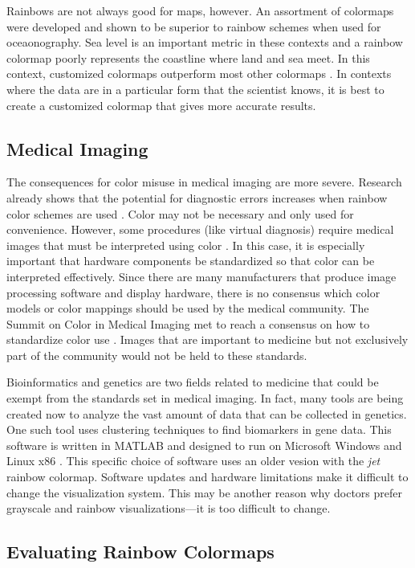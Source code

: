 \documentclass[journal,12pt]{IEEEtran}
\begin{document}
Rainbows are not always good for maps, however. An assortment of colormaps were
developed and shown to be superior to rainbow schemes when used for oceaonography.
Sea level is an important metric in these contexts and a rainbow colormap poorly 
represents the coastline where land and sea meet. In this context, customized colormaps
outperform most other colormaps \cite{oceanography}. In contexts where the data are in a particular form
that the scientist knows, it is best to create a customized colormap that gives 
more accurate results.

\subsection{Medical Imaging}

The consequences for color misuse in medical imaging are more severe. Research
already shows that the potential for diagnostic errors increases when 
rainbow color schemes are used \cite{arteryvis}. Color may not
be necessary and only used for convenience. However, some procedures (like virtual diagnosis) require 
medical images that must be interpreted using color \cite{standardmedimg}. In this case, it
is especially important that hardware components be standardized so that color
can be interpreted effectively. Since there are many manufacturers that produce
image processing software and display hardware, there is no consensus which 
color models or color mappings should be used by the medical community.
The Summit on Color in Medical Imaging
met to reach a consensus on how to standardize color use 
\cite{standardmedimg}. Images that are important to medicine but not exclusively
part of the community would not be held to these standards.

Bioinformatics and genetics are two fields related to medicine that 
could be exempt from the standards set in medical imaging. In fact, many tools
are being created now to analyze the vast amount of data that can be collected
in genetics. One such tool uses clustering techniques to find biomarkers in 
gene data. This software is written in MATLAB and designed to run on Microsoft
Windows and Linux x86 \cite{marvis}. This specific choice of software uses an
older vesion with the \textit{jet} rainbow colormap. 
Software updates and hardware limitations make it difficult to change 
the visualization system. This may be another reason why doctors prefer grayscale and
rainbow visualizations---it is too difficult to change.

\subsection{Evaluating Rainbow Colormaps}
\end{document}
